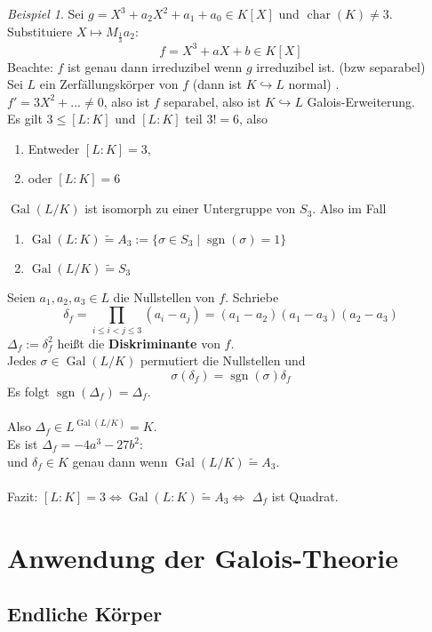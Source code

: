 \documentclass[10pt,a4paper]{article}
\newcommand{\isomorph}{\ensuremath{\tilde{=}}}
\newcommand{\cha}{\ensuremath{\operatorname{char}}}
\newcommand{\Gal}{\ensuremath{\operatorname{Gal}}}
\newcounter{thm}[section]
\theoremstyle{definition}
\theoremstyle{plain}
\theoremstyle{remark}
\newtheorem{exm}[thm]{Beispiel}
\begin{document}
\begin{exm}
	Sei $g=X^3+a_2X^2+a_1+a_0\in K[X]$ und $\cha(K)\neq 3$.\\
	Substituiere $X\mapsto M_\frac{1}{3}a_2$:
	\[f=X^3+aX+b\in K[X]\]
	Beachte: $f$ ist genau dann irreduzibel wenn $g$ irreduzibel ist. (bzw separabel)\\
	Sei $L$ ein Zerfällungskörper von $f$ (dann ist $K\hookrightarrow L$ normal) .\\
	$f'=3X^2+...\neq 0$, also ist $f$ separabel, also ist $K\hookrightarrow L$ Galois-Erweiterung.\\
	Es gilt $3\leq[L:K]$ und $[L:K]$ teil $3!=6$, also
	\begin{enumerate}
		\item Entweder $[L:K]=3$,
		\item oder $[L:K]=6$
	\end{enumerate}
	$\Gal(L/K)$ ist isomorph zu einer Untergruppe von $S_3$. Also im Fall
	\begin{enumerate}
		\item $\Gal(L:K)\isomorph A_3:=\{\sigma\in S_3\mid\operatorname{sgn}(\sigma)=1\}$
	\item $\Gal(L/K)\isomorph S_3$
	\end{enumerate}
	Seien $a_1,a_2,a_3\in L$ die Nullstellen von $f$. Schriebe
	\[\delta_f=\prod_{i\leq i<j\leq 3}(a_i-a_j)=(a_1-a_2)(a_1-a_3)(a_2-a_3)\]
	$\Delta_f:=\delta_f^2$ heißt die \textbf{Diskriminante} von $f$.\\
	Jedes $\sigma\in \Gal(L/K)$ permutiert die Nullstellen und
	\[\sigma(\delta_f)=\operatorname{sgn}(\sigma)\delta_f\]
	Es folgt $\operatorname{sgn}(\Delta_f)=\Delta_f$.\\
	\\
	Also $\Delta_f\in L^{\Gal(L/K)}=K$.\\
	Es ist $\Delta_f=-4a^3-27b^2$:\\
	und $\delta_f\in K$ genau dann wenn $\Gal(L/K)\isomorph A_3$.\\
	\\
	Fazit: $[L:K]=3\Leftrightarrow\Gal(L:K)\isomorph A_3\Leftrightarrow$ $\Delta_f$ ist Quadrat.
\end{exm}



\section{Anwendung der Galois-Theorie}
\subsection{Endliche Körper}
\end{document}
